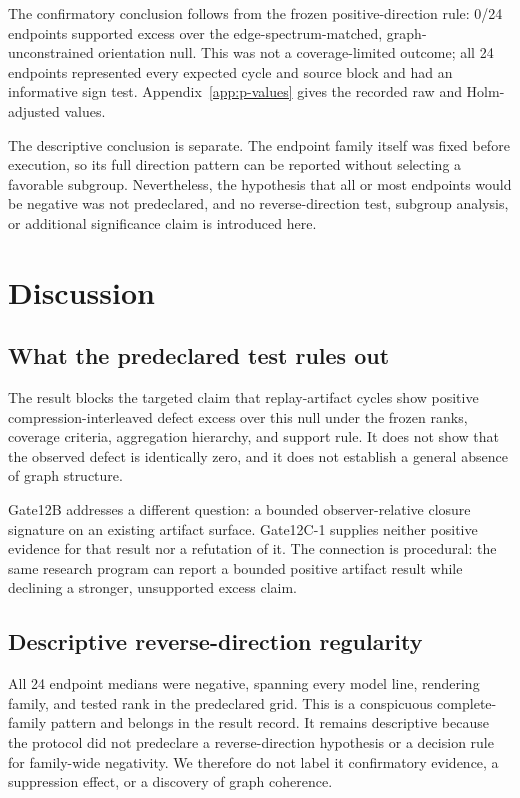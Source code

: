 \documentclass[11pt]{article}
\begin{document}
The confirmatory conclusion follows from the frozen positive-direction rule:
0/24 endpoints supported excess over the edge-spectrum-matched,
graph-unconstrained orientation null. This was not a coverage-limited outcome;
all 24 endpoints represented every expected cycle and source block and had an
informative sign test. Appendix~\ref{app:p-values} gives the recorded raw and
Holm-adjusted values.

The descriptive conclusion is separate. The endpoint family itself was fixed
before execution, so its full direction pattern can be reported without
selecting a favorable subgroup. Nevertheless, the hypothesis that all or most
endpoints would be negative was not predeclared, and no reverse-direction
test, subgroup analysis, or additional significance claim is introduced here.

\section{Discussion}
\label{sec:discussion}

\subsection{What the predeclared test rules out}

The result blocks the targeted claim that replay-artifact cycles show positive
compression-interleaved defect excess over this null under the frozen ranks,
coverage criteria, aggregation hierarchy, and support rule. It does not show
that the observed defect is identically zero, and it does not establish a
general absence of graph structure.

Gate12B addresses a different question: a bounded observer-relative closure
signature on an existing artifact surface. Gate12C-1 supplies neither positive
evidence for that result nor a refutation of it. The connection is procedural:
the same research program can report a bounded positive artifact result while
declining a stronger, unsupported excess claim.

\subsection{Descriptive reverse-direction regularity}

All 24 endpoint medians were negative, spanning every model line, rendering
family, and tested rank in the predeclared grid. This is a conspicuous
complete-family pattern and belongs in the result record. It remains
descriptive because the protocol did not predeclare a reverse-direction
hypothesis or a decision rule for family-wide negativity. We therefore do not
label it confirmatory evidence, a suppression effect, or a discovery of graph
coherence.
\end{document}
